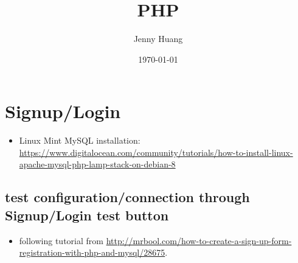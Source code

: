 \documentclass[9pt,b5paper]{article}
\author{Jenny Huang}
\date{\today}
\title{PHP}
\begin{document}
\maketitle
\tableofcontents


\section{Signup/Login}
\label{sec-1}
\begin{itemize}
\item Linux Mint MySQL installation: \url{https://www.digitalocean.com/community/tutorials/how-to-install-linux-apache-mysql-php-lamp-stack-on-debian-8}
\end{itemize}
\subsection{test configuration/connection through Signup/Login test button}
\label{sec-1-1}
\begin{itemize}
\item following tutorial from \url{http://mrbool.com/how-to-create-a-sign-up-form-registration-with-php-and-mysql/28675}.
\end{itemize}
\end{document}
